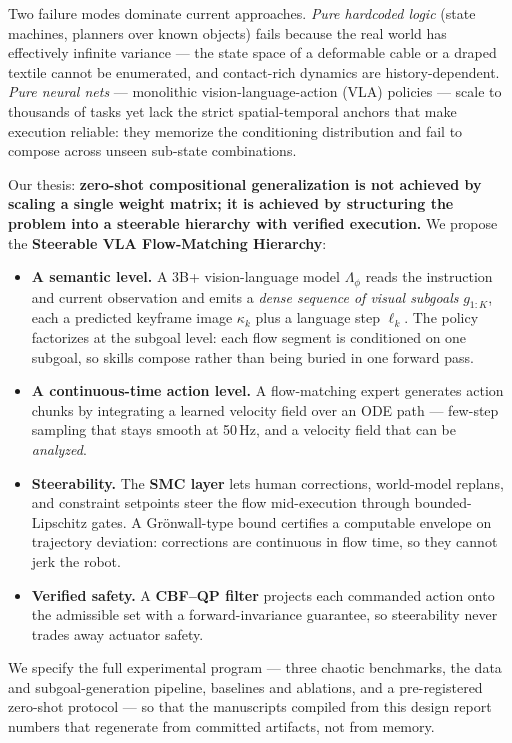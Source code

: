 \documentclass[conference,10pt]{IEEEtran}
\begin{document}
Two failure modes dominate current approaches. \emph{Pure hardcoded logic} (state machines, planners over known objects) fails because the real world has effectively infinite variance --- the state space of a deformable cable or a draped textile cannot be enumerated, and contact-rich dynamics are history-dependent. \emph{Pure neural nets} --- monolithic vision-language-action (VLA) policies \cite{rt2,openvla,octo,pi0} --- scale to thousands of tasks yet lack the strict spatial-temporal anchors that make execution reliable: they memorize the conditioning distribution and fail to compose across unseen sub-state combinations.

Our thesis: \textbf{zero-shot compositional generalization is not achieved by scaling a single weight matrix; it is achieved by structuring the problem into a steerable hierarchy with verified execution.} We propose the \textbf{Steerable VLA Flow-Matching Hierarchy}:

\begin{itemize}
\item \textbf{A semantic level.} A 3B+ vision-language model $\Lambda_\phi$ reads the instruction and current observation and emits a \emph{dense sequence of visual subgoals} $g_{1:K}$, each a predicted keyframe image $\kappa_k$ plus a language step $\ell_k$. The policy factorizes at the subgoal level: each flow segment is conditioned on one subgoal, so skills compose rather than being buried in one forward pass.
\item \textbf{A continuous-time action level.} A flow-matching expert \cite{lipman,tong,pi0} generates action chunks by integrating a learned velocity field over an ODE path --- few-step sampling that stays smooth at 50\,Hz, and a velocity field that can be \emph{analyzed}.
\item \textbf{Steerability.} The \textbf{SMC layer} lets human corrections, world-model replans, and constraint setpoints steer the flow mid-execution through bounded-Lipschitz gates. A Gr\"onwall-type bound certifies a computable envelope on trajectory deviation: corrections are continuous in flow time, so they cannot jerk the robot.
\item \textbf{Verified safety.} A \textbf{CBF--QP filter} \cite{ames2014,ames2019} projects each commanded action onto the admissible set with a forward-invariance guarantee, so steerability never trades away actuator safety.
\end{itemize}

We specify the full experimental program --- three chaotic benchmarks, the data and subgoal-generation pipeline, baselines and ablations, and a pre-registered zero-shot protocol --- so that the manuscripts compiled from this design report numbers that regenerate from committed artifacts, not from memory.
\end{document}
